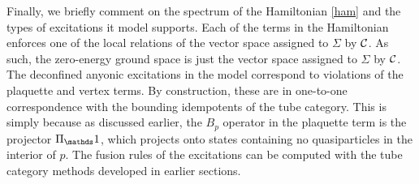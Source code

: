 Finally, we briefly comment on the spectrum of the Hamiltonian \eqref{ham} and the types of excitations it model supports. 
Each of the terms in the Hamiltonian enforces one of the local relations of the vector space assigned to $\Sigma$ by $\mathcal{C}$. 
As such, the zero-energy ground space is just the vector space assigned to $\Sigma$ by $\mathcal{C}$.
The deconfined anyonic excitations in the model correspond to violations of the plaquette and vertex terms.
By construction, these are in one-to-one correspondence with the bounding idempotents of the tube category.
This is simply because as discussed earlier, the $B_p$ operator in the plaquette term is the projector $\Pi_\unit$, which projects onto states containing no quasiparticles in the interior of $p$. 
The fusion rules of the excitations can be computed with the tube category methods developed in earlier sections. 


